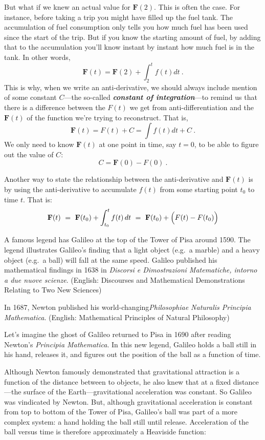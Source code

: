 \documentclass[
  letterpaper,
  DIV=11,
  numbers=noendperiod,
  oneside]{scrreprt}
\begin{document}
But what if we knew an actual value for \({\mathbf F}(2)\). This is
often the case. For instance, before taking a trip you might have filled
up the fuel tank. The accumulation of fuel consumption only tells you
how much fuel has been used since the start of the trip. But if you know
the starting amount of fuel, by adding that to the accumulation you'll
know instant by instant how much fuel is in the tank. In other words,
\[{\mathbf F}(t) = {\mathbf F}(2) + \int_2^t f(t) dt\ .\] This is why,
when we write an anti-derivative, we should always include mention of
some constant \(C\)---the so-called \textbf{\emph{constant of
integration}}---to remind us that there is a difference between the
\(F(t)\) we get from anti-differentiation and the \({\mathbf F}(t)\) of
the function we're trying to reconstruct. That is,
\[{\mathbf F}(t) = F(t) + C = \int f(t) dt + C\ .\] We only need to know
\({\mathbf F}(t)\) at one point in time, say \(t=0\), to be able to
figure out the value of \(C\): \[C = {\mathbf F}(0) - F(0)\ .\]

Another way to state the relationship between the anti-derivative and
\({\mathbf F}(t)\) is by using the anti-derivative to accumulate
\(f(t)\) from some starting point \(t_0\) to time \(t\). That is:
\[{\mathbf F}(t) \ =\  {\mathbf F}(t_0) + \int_{t_0}^t f(t)\, dt\  = \ 
{\mathbf F}(t_0) + \left({\large\strut}F(t) - F(t_0)\right)\]

A famous legend has Galileo at the top of the Tower of Pisa around 1590.
The legend illustrates Galileo's finding that a light object (e.g.~a
marble) and a heavy object (e.g.~a ball) will fall at the same speed.
Galileo published his mathematical findings in 1638 in \emph{Discorsi e
Dimostrazioni Matematiche, intorno a due nuove scienze}. (English:
Discourses and Mathematical Demonstrations Relating to Two New Sciences)

In 1687, Newton published his world-changing\emph{Philosophiae Naturalis
Principia Mathematica}. (English: Mathematical Principles of Natural
Philosophy)

Let's imagine the ghost of Galileo returned to Pisa in 1690 after
reading Newton's \emph{Principia Mathematica}. In this new legend,
Galileo holds a ball still in his hand, releases it, and figures out the
position of the ball as a function of time.

Although Newton famously demonstrated that gravitational attraction is a
function of the distance between to objects, he also knew that at a
fixed distance---the surface of the Earth---gravitational acceleration
was constant. So Galileo was vindicated by Newton. But, although
gravitational acceleration is constant from top to bottom of the Tower
of Pisa, Galileo's ball was part of a more complex system: a hand
holding the ball still until release. Acceleration of the ball versus
time is therefore approximately a Heaviside function:
\end{document}
